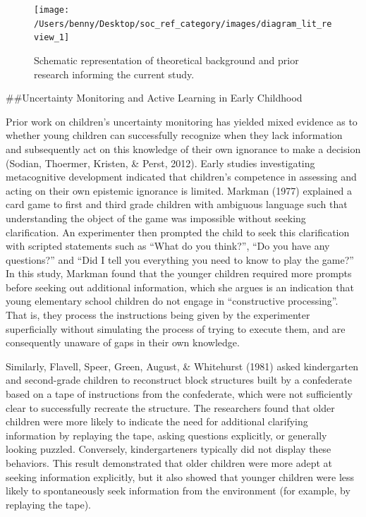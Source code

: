 \documentclass[,man,floatsintext]{apa6}
\begin{document}
\begin{figure}

{\centering \texttt{[image: /Users/benny/Desktop/soc\_ref\_category/images/diagram\_lit\_review\_1]} 

}

\caption{Schematic representation of theoretical background and prior research informing the current study.}\label{fig:schematic}
\end{figure}

\#\#Uncertainty Monitoring and Active Learning in Early Childhood

Prior work on children's uncertainty monitoring has yielded mixed evidence as to whether young children can successfully recognize when they lack information and subsequently act on this knowledge of their own ignorance to make a decision (Sodian, Thoermer, Kristen, \& Perst, 2012). Early studies investigating metacognitive development indicated that children's competence in assessing and acting on their own epistemic ignorance is limited. Markman (1977) explained a card game to first and third grade children with ambiguous language such that understanding the object of the game was impossible without seeking clarification. An experimenter then prompted the child to seek this clarification with scripted statements such as \enquote{What do you think?}, \enquote{Do you have any questions?} and \enquote{Did I tell you everything you need to know to play the game?} In this study, Markman found that the younger children required more prompts before seeking out additional information, which she argues is an indication that young elementary school children do not engage in \enquote{constructive processing}. That is, they process the instructions being given by the experimenter superficially without simulating the process of trying to execute them, and are consequently unaware of gaps in their own knowledge.

Similarly, Flavell, Speer, Green, August, \& Whitehurst (1981) asked kindergarten and second-grade children to reconstruct block structures built by a confederate based on a tape of instructions from the confederate, which were not sufficiently clear to successfully recreate the structure. The researchers found that older children were more likely to indicate the need for additional clarifying information by replaying the tape, asking questions explicitly, or generally looking puzzled. Conversely, kindergarteners typically did not display these behaviors. This result demonstrated that older children were more adept at seeking information explicitly, but it also showed that younger children were less likely to spontaneously seek information from the environment (for example, by replaying the tape).
\end{document}

